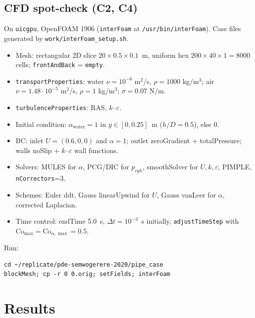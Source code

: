 \documentclass[11pt,a4paper]{article}
\begin{document}
\subsection{CFD spot-check (C2, C4)}
On \texttt{uicgpu}, OpenFOAM 1906 (\texttt{interFoam} at
\texttt{/usr/bin/interFoam}). Case files generated by
\texttt{work/interFoam\_setup.sh}.
\begin{itemize}
\item Mesh: rectangular 2D slice $20\times0.5\times0.1$~m, uniform hex
$200\times40\times1 = 8000$ cells; \texttt{frontAndBack} = \texttt{empty}.
\item \texttt{transportProperties}: water $\nu=10^{-6}$ m$^2$/s,
$\rho=1000$ kg/m$^3$; air $\nu=1.48\cdot10^{-5}$ m$^2$/s, $\rho=1$ kg/m$^3$;
$\sigma=0.07$ N/m.
\item \texttt{turbulenceProperties}: RAS, $k$--$\varepsilon$.
\item Initial condition: $\alpha_{\text{water}}=1$ in $y\in[0,0.25]$~m
($h/D=0.5$), else 0.
\item BC: inlet $U=(0.6,0,0)$ and $\alpha=1$; outlet zeroGradient +
totalPressure; walls noSlip + $k$--$\varepsilon$ wall functions.
\item Solvers: MULES for $\alpha$, PCG/DIC for $p_{rgh}$, smoothSolver for
$U,k,\varepsilon$; PIMPLE, \texttt{nCorrectors}=3.
\item Schemes: Euler ddt, Gauss linearUpwind for $U$, Gauss vanLeer for
$\alpha$, corrected Laplacian.
\item Time control: endTime 5.0~s, $\Delta t = 10^{-3}$~s initially,
\texttt{adjustTimeStep} with $\mathrm{Co}_{\max}=\mathrm{Co}_{\alpha,\max}=0.5$.
\end{itemize}
Run:
\begin{Verbatim}[fontsize=\small]
cd ~/replicate/pde-semwogerere-2020/pipe_case
blockMesh; cp -r 0 0.orig; setFields; interFoam
\end{Verbatim}

\section{Results}
\end{document}
